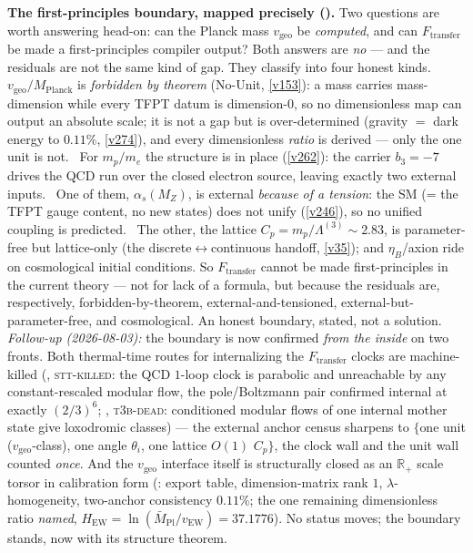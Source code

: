 \par\smallskip\noindent\textbf{The first-principles boundary, mapped precisely ().}
Two questions are worth answering head-on: can the Planck mass $v_{\mathrm{geo}}$ be \emph{computed}, and can
$F_{\mathrm{transfer}}$ be made a first-principles compiler output? Both answers are \emph{no} --- and the
residuals are not the same kind of gap. They classify into four honest kinds. \mE\ $v_{\mathrm{geo}}/M_{\mathrm{Planck}}$
is \emph{forbidden by theorem} (No-Unit, \vref{v153}): a mass carries mass-dimension while every TFPT datum is
dimension-$0$, so no dimensionless map can output an absolute scale; it is not a gap but is over-determined (gravity
$=$ dark energy to $0.11\%$, \vref{v274}), and every dimensionless \emph{ratio} is derived --- only the one unit is
not. \mE\ For $m_p/m_e$ the structure is in place (\vref{v262}): the carrier $b_3{=}{-}7$ drives the QCD run over the
closed electron source, leaving exactly two external inputs. \mX\ One of them, $\alpha_s(M_Z)$, is external
\emph{because of a tension}: the SM (= the TFPT gauge content, no new states) does not unify (\vref{v246}), so no
unified coupling is predicted. \mC\ The other, the lattice $C_p=m_p/\Lambda^{(3)}\!\sim\!2.83$, is parameter-free
but lattice-only (the discrete$\leftrightarrow$continuous handoff, \vref{v35}); and $\eta_B$/axion ride on
cosmological initial conditions. So $F_{\mathrm{transfer}}$ cannot be made first-principles in the current theory ---
not for lack of a formula, but because the residuals are, respectively, forbidden-by-theorem, external-and-tensioned,
external-but-parameter-free, and cosmological. An honest boundary, stated, not a solution.
\emph{Follow-up (2026-08-03):} the boundary is now confirmed \emph{from the inside} on two fronts.  Both
thermal-time routes for internalizing the $F_{\mathrm{transfer}}$ clocks are machine-killed
(, \textsc{stt-killed}: the QCD $1$-loop clock is parabolic and
unreachable by any constant-rescaled modular flow, the pole/Boltzmann pair confirmed internal at exactly
$(2/3)^6$; , \textsc{t3b-dead}: conditioned modular flows of one
internal mother state give loxodromic classes) --- the external anchor census sharpens to $\{$one unit
($v_{\mathrm{geo}}$-class), one angle $\theta_i$, one lattice $O(1)$ $C_p\}$, the clock wall and the unit
wall counted \emph{once}.  And the $v_{\mathrm{geo}}$ interface itself is structurally closed as an
$\mathbb R_+$ scale torsor in calibration form (: export table,
dimension-matrix rank $1$, $\lambda$-homogeneity, two-anchor consistency $0.11\%$; the one remaining
dimensionless ratio \emph{named}, $H_{\mathrm{EW}}=\ln(\bar M_{\mathrm{Pl}}/v_{\mathrm{EW}})=37.1776$).  No status moves;
the boundary stands, now with its structure theorem.

